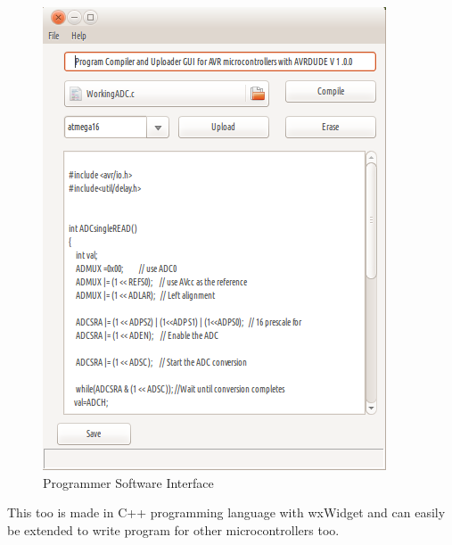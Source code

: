 \documentclass[11pt,a4paper]{article}
\begin{document}
\begin{figure}[hbtp]
\centering
\includegraphics[scale=.4]{Images/AvrGUI.png}
\caption{Programmer Software Interface}
\end{figure}

This too is made in C++ programming language with wxWidget and can easily be extended to write program for other microcontrollers too. 
\end{document}
